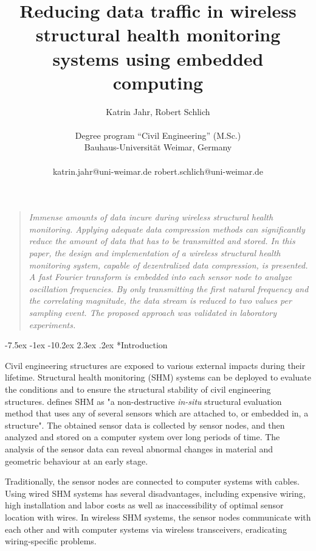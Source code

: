 \documentclass[12pt,a4paper]{scrartcl}
\title{\textbf{ \Large {Reducing data traffic in wireless structural health monitoring systems using embedded computing}}}
\author
{\large Katrin Jahr, Robert Schlich\\
\\
\normalsize{Degree program “Civil Engineering” (M.Sc.)}\\
\normalsize{Bauhaus-Universität Weimar, Germany}\\
\\
\normalsize{katrin.jahr@uni-weimar.de \qquad}
\normalsize{robert.schlich@uni-weimar.de}
}
\date{}
\makeatletter
\renewcommand\section{\@startsection{section}{1}{\z@}%
                     {-7.5ex \@plus -1ex \@minus -10.2ex}%
                     {2.3ex \@plus.2ex}%
                     {\sffamily\large\bfseries}}
\newenvironment{sciabstract}{%
\begin{quote} \itshape}
{\end{quote}}
\makeatother
\begin{document}
 


\baselineskip20pt


\maketitle 
\vspace{-2em}

% 
\setlength{\emergencystretch}{3pt}


\begin{sciabstract}
Immense amounts of data incure during wireless structural health monitoring.
Applying adequate data compression methods can significantly reduce the amount of data that has to be transmitted and stored.
In this paper, the design and implementation of a wireless structural health monitoring system, capable of dezentralized data compression, is presented. 
A fast Fourier transform is embedded into each sensor node to analyze oscillation frequencies. 
By only transmitting the first natural frequency and the correlating magnitude, the data stream is reduced to two values per sampling event.
The proposed approach was validated in laboratory experiments.

\end{sciabstract}


\section*{Introduction}

Civil engineering structures are exposed to various external impacts during their lifetime. 
Structural health monitoring (SHM) systems can be deployed to evaluate the conditions and to ensure the structural stability of civil engineering structures.
\citet{BisbySHM} defines SHM as "a non-destructive \textit{in-situ} structural evaluation method that uses any of several sensors which are attached to, or embedded in, a structure".
The obtained sensor data is collected by sensor nodes, and then analyzed and stored on a computer system over long periods of time. 
The analysis of the sensor data can reveal abnormal changes in material and geometric behaviour at an early stage.

Traditionally, the sensor nodes are connected to computer systems with cables.
Using wired SHM systems has several disadvantages, including expensive wiring, high installation and labor costs as well as inaccessibility of optimal sensor location with wires.
In wireless SHM systems, the sensor nodes communicate with each other and with computer systems via wireless transceivers, eradicating wiring-specific problems.
\end{document}
